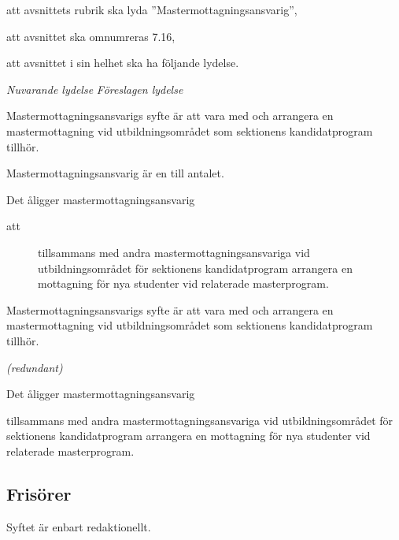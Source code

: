 \documentclass{article}
\newenvironment{lydelse}
    {\begin{paracol}{2}%
        \emph{Nuvarande lydelse}%
        \switchcolumn%
        \emph{Föreslagen lydelse}%
    \end{paracol}%
    \begin{enumerate}[label=\thesubsection.\arabic*]%
    \begin{paracol}{2}%
    }{\end{paracol}\end{enumerate}}
\begin{document}
\begin{dels}
    \item att avsnittets rubrik ska lyda ''Mastermottagningsansvarig'',
    \item att avsnittet ska omnumreras 7.16,
    \item att avsnittet i sin helhet ska ha följande lydelse.
\end{dels}
\begin{lydelse}
    \setcounter{section}{8}
    \setcounter{subsection}{17}
    
    \item Mastermottagningsansvarigs syfte är att vara med och arrangera en mastermottagning vid utbildningsområdet som sektionens kandidatprogram tillhör.
        
    \item Mastermottagningsansvarig är en till antalet.
    
    \item Det åligger mastermottagningsansvarig
    \begin{description}
        \item[att] tillsammans med andra mastermottagningsansvariga vid utbildningsområdet för sektionens kandidatprogram arrangera en mottagning för nya studenter vid relaterade masterprogram.
    \end{description}
    
    \setcounter{section}{7}
    \setcounter{subsection}{16}
    \switchcolumn
    
    \item Mastermottagningsansvarigs syfte är att vara med och arrangera en mastermottagning vid utbildningsområdet som sektionens kandidatprogram tillhör.
        
    \item[] \emph{(redundant)}  
    
    \item Det åligger mastermottagningsansvarig
    \begin{aligganden}
        \vspace{-0.4em}
        \item tillsammans med andra mastermottagningsansvariga vid utbildningsområdet för sektionens kandidatprogram arrangera en mottagning för nya studenter vid relaterade masterprogram.
    \end{aligganden}
    
\end{lydelse}

\subsection{Frisörer}
Syftet är enbart redaktionellt.
\end{document}
